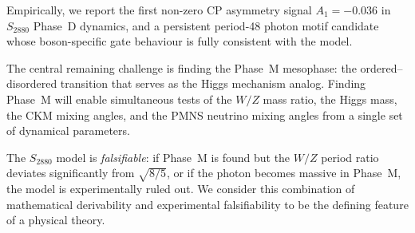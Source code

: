 \documentclass[11pt,a4paper]{article}
\theoremstyle{remark}
\begin{document}
Empirically, we report the first non-zero CP asymmetry signal $A_1 = -0.036$ in
$S_{2880}$ Phase~D dynamics, and a persistent period-48 photon motif candidate whose
boson-specific gate behaviour is fully consistent with the model.

The central remaining challenge is finding the Phase~M mesophase: the ordered--disordered
transition that serves as the Higgs mechanism analog.  Finding Phase~M will enable
simultaneous tests of the $W/Z$ mass ratio, the Higgs mass, the CKM mixing angles,
and the PMNS neutrino mixing angles from a single set of dynamical parameters.

The $S_{2880}$ model is \emph{falsifiable}: if Phase~M is found but the $W/Z$ period
ratio deviates significantly from $\sqrt{8/5}$, or if the photon becomes massive in
Phase~M, the model is experimentally ruled out.  We consider this combination of
mathematical derivability and experimental falsifiability to be the defining feature
of a physical theory.
\end{document}
